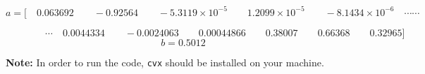 \begin{footnotesize}
\mathleft
\[
a= \text{[}\quad 0.063692  \qquad  -0.92564 \qquad -5.3119\times 10^{-5}  \qquad   1.2099\times 10^{-5} \qquad -8.1434 \times 10^{-6} \quad  \cdots\cdots
\]

\[
\qquad \qquad  \cdots \quad 0.0044334    \qquad -0.0024063 \qquad   0.00044866       \qquad  0.38007 \qquad    0.66368 \qquad  0.32965 \text{]}
\]
\[
b = 0.5012
\]
\end{footnotesize}



\textbf{Note:} In order to run the code, \texttt{cvx} should be installed on your machine. 